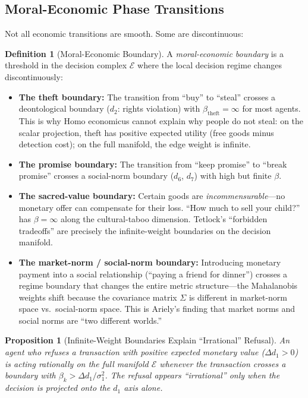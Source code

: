 \documentclass[12pt]{article}
\newtheorem{proposition}[theorem]{Proposition}
\theoremstyle{definition}
\newtheorem{definition}[theorem]{Definition}
\theoremstyle{remark}
\newcommand{\E}{\mathcal{E}}               %
\begin{document}
\subsection{Moral-Economic Phase Transitions}

Not all economic transitions are smooth.  Some are discontinuous:

\begin{definition}[Moral-Economic Boundary]
\label{def:boundary}
A \emph{moral-economic boundary} is a threshold in the decision complex $\E$ where the local decision regime changes discontinuously:
\begin{itemize}
    \item \textbf{The theft boundary:} The transition from ``buy'' to ``steal'' crosses a deontological boundary ($d_2$: rights violation) with $\beta_{\text{theft}} = \infty$ for most agents.  This is why Homo economicus cannot explain why people do not steal: on the scalar projection, theft has positive expected utility (free goods minus detection cost); on the full manifold, the edge weight is infinite.
    \item \textbf{The promise boundary:} The transition from ``keep promise'' to ``break promise'' crosses a social-norm boundary ($d_6$, $d_7$) with high but finite $\beta$.
    \item \textbf{The sacred-value boundary:} Certain goods are \emph{incommensurable}---no monetary offer can compensate for their loss.  ``How much to sell your child?'' has $\beta = \infty$ along the cultural-taboo dimension.  Tetlock's ``forbidden tradeoffs'' \cite{tetlock2000} are precisely the infinite-weight boundaries on the decision manifold.
    \item \textbf{The market-norm / social-norm boundary:} Introducing monetary payment into a social relationship (``paying a friend for dinner'') crosses a regime boundary that changes the entire metric structure---the Mahalanobis weights shift because the covariance matrix $\Sigma$ is different in market-norm space vs.\ social-norm space.  This is Ariely's \cite{ariely2008} finding that market norms and social norms are ``two different worlds.''
\end{itemize}
\end{definition}

\begin{proposition}[Infinite-Weight Boundaries Explain ``Irrational'' Refusal]
\label{prop:infinite_weight}
An agent who refuses a transaction with positive expected monetary value ($\Delta d_1 > 0$) is acting rationally on the full manifold $\E$ whenever the transaction crosses a boundary with $\beta_k > \Delta d_1 / \sigma_1^2$.  The refusal appears ``irrational'' only when the decision is projected onto the $d_1$ axis alone.
\end{proposition}
\end{document}
